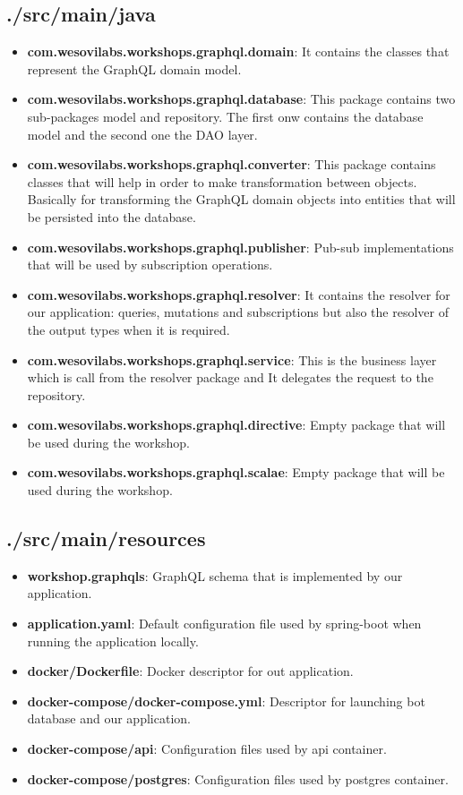 \documentclass[]{book}
\begin{document}
\subsection{./src/main/java}\label{srcmainjava}

\begin{itemize}
\item
  \textbf{com.wesovilabs.workshops.graphql.domain}: It contains the
  classes that represent the GraphQL domain model.
\item
  \textbf{com.wesovilabs.workshops.graphql.database}: This package
  contains two sub-packages model and repository. The first onw contains
  the database model and the second one the DAO layer.
\item
  \textbf{com.wesovilabs.workshops.graphql.converter}: This package
  contains classes that will help in order to make transformation
  between objects. Basically for transforming the GraphQL domain objects
  into entities that will be persisted into the database.
\item
  \textbf{com.wesovilabs.workshops.graphql.publisher}: Pub-sub
  implementations that will be used by subscription operations.
\item
  \textbf{com.wesovilabs.workshops.graphql.resolver}: It contains the
  resolver for our application: queries, mutations and subscriptions but
  also the resolver of the output types when it is required.
\item
  \textbf{com.wesovilabs.workshops.graphql.service}: This is the
  business layer which is call from the resolver package and It
  delegates the request to the repository.
\item
  \textbf{com.wesovilabs.workshops.graphql.directive}: Empty package
  that will be used during the workshop.
\item
  \textbf{com.wesovilabs.workshops.graphql.scalae}: Empty package that
  will be used during the workshop.
\end{itemize}

\subsection{./src/main/resources}\label{srcmainresources}

\begin{itemize}
\item
  \textbf{workshop.graphqls}: GraphQL schema that is implemented by our
  application.
\item
  \textbf{application.yaml}: Default configuration file used by
  spring-boot when running the application locally.
\item
  \textbf{docker/Dockerfile}: Docker descriptor for out application.
\item
  \textbf{docker-compose/docker-compose.yml}: Descriptor for launching
  bot database and our application.
\item
  \textbf{docker-compose/api}: Configuration files used by api
  container.
\item
  \textbf{docker-compose/postgres}: Configuration files used by postgres
  container.
\end{itemize}
\end{document}
